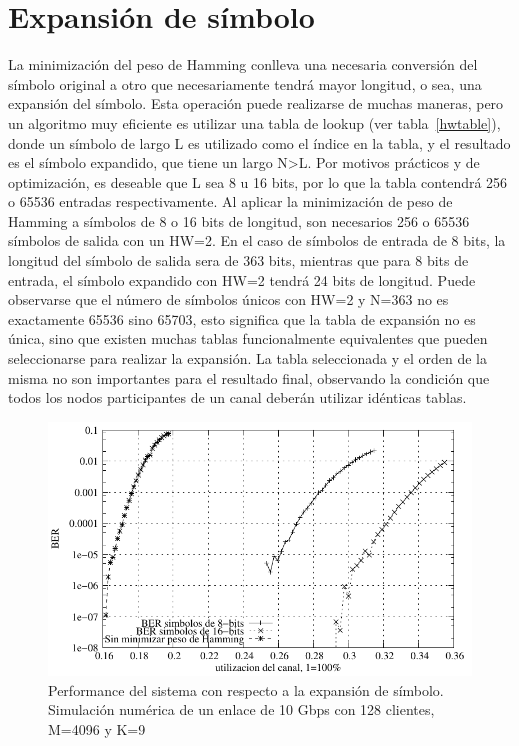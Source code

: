 \section{Expansión de símbolo}
La minimización del peso de Hamming conlleva una necesaria conversión del símbolo original a otro que necesariamente tendrá mayor longitud, o sea, una expansión del símbolo.
Esta operación puede realizarse de muchas maneras, pero un algoritmo muy eficiente es utilizar una tabla de lookup (ver tabla~\ref{hwtable}), donde un símbolo de largo L es utilizado como el índice en la tabla, y el resultado es el símbolo expandido, que tiene un largo N\textgreater L.
Por motivos prácticos y de optimización, es deseable que L sea 8 u 16 bits, por lo que la tabla contendrá 256 o 65536 entradas respectivamente.
Al aplicar la minimización de peso de Hamming a símbolos de 8 o 16 bits de longitud, son necesarios 256 o 65536 símbolos de salida con un HW=2. En el caso de símbolos de entrada de 8 bits, la longitud del símbolo de salida sera de 363 bits, mientras que para 8 bits de entrada, el símbolo expandido con HW=2 tendrá 24 bits de longitud.
Puede observarse que el número de símbolos únicos con HW=2 y N=363 no es exactamente 65536 sino 65703, esto significa que la tabla de expansión no es única, sino que existen muchas tablas funcionalmente equivalentes que pueden seleccionarse para realizar la expansión.
La tabla seleccionada y el orden de la misma no son importantes para el resultado final, observando la condición que todos los nodos participantes de un canal deberán utilizar idénticas tablas.
\begin{figure}[!t]
  \centering
    \includegraphics[width=6in]{graphs/BERvsChannelES2}
    \caption{Performance del sistema con respecto a la expansión de símbolo. Simulación numérica de un enlace de 10 Gbps con 128 clientes, M=4096 y K=9}
    \label{BERvsExpansion}
\end{figure}


